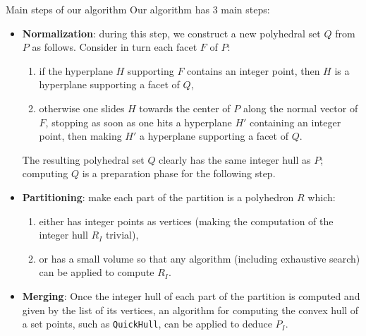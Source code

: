 \begin{frame}{Main steps of our algorithm}
	Our algorithm has 3 main steps:
	\begin{itemize}
		\item \textbf{Normalization}: during this step, we construct a new polyhedral set
		$Q$ from $P$ as follows.
		Consider in turn each facet $F$ of $P$:
		\begin{enumerate}
			\item if the hyperplane $H$ supporting $F$ contains an integer point,
			then $H$ is a hyperplane supporting a facet of $Q$,
			\item otherwise 
			one slides $H$ towards the center of $P$
			along the normal vector of $F$, stopping 
			as soon as one hits a hyperplane $H'$ containing an integer point,
			then making $H'$ a hyperplane supporting a facet of $Q$.
		\end{enumerate}
		The resulting polyhedral set $Q$ clearly has the same integer
		hull as $P$; computing $Q$ is a preparation phase for the following step.
		\item \textbf{Partitioning}: make each part
		of the partition is a polyhedron $R$ which:
		\begin{enumerate}
			\item either has integer points as vertices
			(making the computation of the integer hull $R_I$ trivial), 
			\item or has a small volume so that any algorithm
			(including exhaustive search) can be applied to compute $R_I$.
		\end{enumerate}
		\item \textbf{Merging}: Once the integer hull of each part of the partition
		is computed and given by the list of its vertices, 
		an algorithm for computing the convex hull of a set points,
		such as {\tt QuickHull},
		can be applied to deduce $P_I$.
	\end{itemize}
\end{frame}
